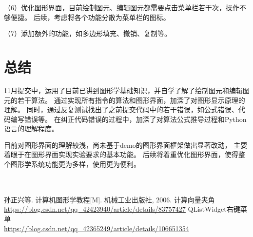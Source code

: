 \documentclass[a4paper,UTF8]{article}
\begin{document}
（6）优化图形界面，目前绘制图元、编辑图元都需要点击菜单栏若干次，操作不够便捷。
后续，考虑将各个功能分散为菜单栏的图标。

（7）添加额外的功能，如多边形填充、撤销、复制等。


\section{总结}
11月提交中，运用了目前已讲到图形学基础知识，并自学了解了绘制图元和编辑图元的若干算法。
通过实现所有指令的算法和图形界面，加深了对图形显示原理的理解。
同时，通过反复测试找出了之前提交代码中的若干错误，如公式错误、代码编写错误等。
在纠正代码错误的过程中，加深了对算法公式推导过程和Python语言的理解程度。

目前对图形界面的理解较浅，尚未基于demo的图形界面框架做出显著改动，
主要着眼于在图形界面实现实验要求的基本功能。
后续将着重优化图形界面，使得整个图形学系统功能更为多样，使用更为便利。
\\\\\\




\begin{thebibliography}{99}
 孙正兴等. 计算机图形学教程[M]. 机械工业出版社, 2006.
 计算向量夹角\\\url{https://blog.csdn.net/qq_42423940/article/details/83757427}
 QListWidget右键菜单\\\url{https://blog.csdn.net/qq_42365249/article/details/106651354}
\end{thebibliography}
\end{document}
